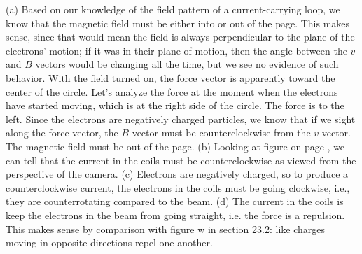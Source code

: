  (a) Based on our knowledge of the field pattern of a
current-carrying loop, we know that the magnetic field must
be either into or out of the page. This makes sense, since
that would mean the field is always perpendicular to the
plane of the electrons' motion; if it was in their plane of
motion, then the angle between the $v$ and $B$ vectors would
be changing all the time, but we see no evidence of such
behavior. With the field turned on, the force vector is
apparently toward the center of the circle. Let's analyze
the force at the moment when the electrons have started
moving, which is at the right side of the circle. The force
is to the left. Since the electrons are negatively charged
particles, we know that if we sight along the force vector,
the $B$ vector must be counterclockwise from the $v$ vector.
The magnetic field must be out of the page. (b) Looking at
figure  on page \pageref{fig:magnetic-field-equations}, we can tell that the
current in the coils must be counterclockwise as viewed from
the perspective of the camera. (c) Electrons are negatively
charged, so to produce a counterclockwise current, the
electrons in the coils must be going clockwise, i.e.,
they are counterrotating compared to the beam. (d) The
current in the coils is keep the electrons in the beam from
going straight, i.e. the force is a repulsion. This makes
sense by comparison with figure w in section 23.2:
like charges moving in opposite directions repel one another.
